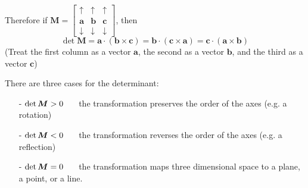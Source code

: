 \documentclass[11pt, a4paper]{article}
\begin{document}
Therefore if $\boldsymbol{M}=\begin{bmatrix} \uparrow & \uparrow & \uparrow \\ \boldsymbol{a} & \boldsymbol{b} & \boldsymbol{c} \\ \downarrow & \downarrow & \downarrow \end{bmatrix}$, then 
\begin{equation*}
\det\boldsymbol{M}=\boldsymbol{a}\cdot(\boldsymbol{b}\times\boldsymbol{c})=\boldsymbol{b}\cdot(\boldsymbol{c}\times\boldsymbol{a})=\boldsymbol{c}\cdot(\boldsymbol{a}\times\boldsymbol{b})
\end{equation*} (Treat the first column as a vector $\boldsymbol{a}$, the second as a vector $\boldsymbol{b}$, and the third as a vector $\boldsymbol{c}$)\newline \par

There are three cases for the determinant:
\begin{itemize}
\item[-]$\det\boldsymbol{M}>0 \hspace{.5cm}$ the transformation preserves the order of the axes (e.g. a rotation)
\item[-]$\det\boldsymbol{M}<0 \hspace{.5cm}$ the transformation reverses the order of the axes (e.g. a reflection)
\item[-]$\det\boldsymbol{M}=0 \hspace{.5cm}$ the transformation maps three dimensional space to a plane, a point, or a line.
\end{itemize}
\vspace{0.5cm}
\end{document}
